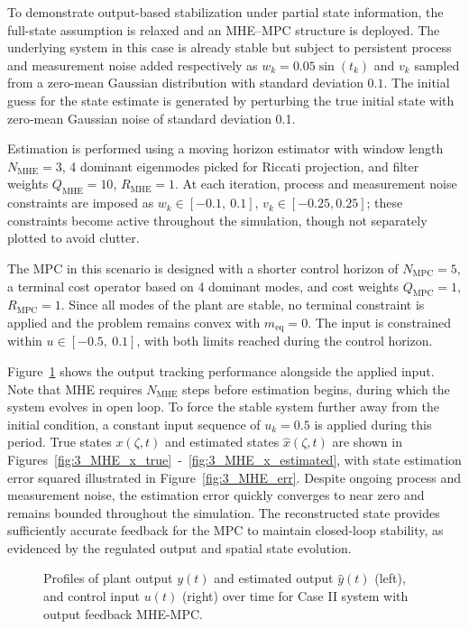 To demonstrate output-based stabilization under partial state information, the full-state assumption is relaxed and an MHE--MPC structure is deployed. The underlying system in this case is already stable but subject to persistent process and measurement noise added respectively as $w_k = 0.05 \sin(t_k)$ and $v_k$ sampled from a zero-mean Gaussian distribution with standard deviation $0.1$. The initial guess for the state estimate is generated by perturbing the true initial state with zero-mean Gaussian noise of standard deviation 0.1. 

Estimation is performed using a moving horizon estimator with window length $N_{\mathrm{MHE}} = 3$, 4 dominant eigenmodes picked for Riccati projection, and filter weights $Q_{\mathrm{MHE}} = 10$, $R_{\mathrm{MHE}} = 1$. At each iteration, process and measurement noise constraints are imposed as $w_k \in [-0.1,\ 0.1]$, $v_k \in [-0.25, 0.25]$; these constraints become active throughout the simulation, though not separately plotted to avoid clutter.

The MPC in this scenario is designed with a shorter control horizon of $N_{\mathrm{MPC}} = 5$, a terminal cost operator based on 4 dominant modes, and cost weights $Q_{\mathrm{MPC}} = 1$, $R_{\mathrm{MPC}} = 1$. Since all modes of the plant are stable, no terminal constraint is applied and the problem remains convex with $m_{\mathrm{eq}} = 0$. The input is constrained within $u \in [-0.5,\ 0.1]$, with both limits reached during the control horizon.

Figure~\ref{fig:3_input_output_MHE} shows the output tracking performance alongside the applied input. Note that MHE requires $N_{\mathrm{MHE}}$ steps before estimation begins, during which the system evolves in open loop. To force the stable system further away from the initial condition, a constant input sequence of $u_k = 0.5$ is applied during this period. True states $x(\zeta,t)$ and estimated states $\hat{x}(\zeta,t)$ are shown in Figures~\ref{fig:3_MHE_x_true}~-~\ref{fig:3_MHE_x_estimated}, with state estimation error squared illustrated in Figure~\ref{fig:3_MHE_err}. Despite ongoing process and measurement noise, the estimation error quickly converges to near zero and remains bounded throughout the simulation. The reconstructed state provides sufficiently accurate feedback for the MPC to maintain closed-loop stability, as evidenced by the regulated output and spatial state evolution.

\begin{figure}[!htbp]
    \centering
    
    \caption{Profiles of plant output $y(t)$ and estimated output $\hat{y}(t)$ (left), and control input $u(t)$ (right) over time for Case II system with output feedback MHE-MPC.}
    \label{fig:3_input_output_MHE}
\end{figure}

